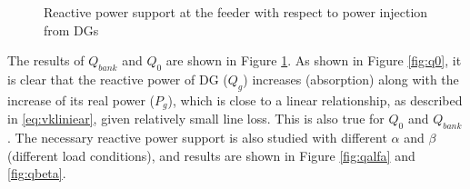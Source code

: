 \documentclass{article}
\begin{document}
\begin{figure}[h]
\centering
\quad
    \caption{Reactive power support at the feeder with respect to power injection from DGs} 
    \label{fig:q0qbank}
\end{figure}
The results of $Q_{bank}$ and $Q_0$ are shown in Figure \ref{fig:q0qbank}. As shown in Figure \ref{fig:q0}, it is clear that the reactive power of DG ($Q_g$) increases (absorption) along with the increase of its real power ($P_g$), which is close to a linear relationship, as described in \eqref{eq:vkliniear}, given relatively small line loss. This is also true for $Q_0$ and $Q_{bank}$. The necessary reactive power support is also studied with different $\alpha$ and $\beta$ (different load conditions), and results are shown in Figure \ref{fig:qalfa} and \ref{fig:qbeta}.
\end{document}
